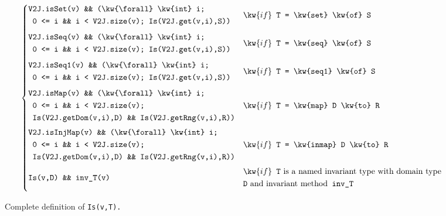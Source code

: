 \begin{figure*}[ht]
\begin{mdframed}
\begin{equation*}
\begin{cases}
  \!\begin{aligned}%
    & \texttt{V2J.isSet(v) \&\& (\kw{\textbackslash forall} \kw{int} i;}\\
    & \texttt{ 0 <= i \&\& i < V2J.size(v); Is(V2J.get(v,i),S))}
    \end{aligned}           & \kw{if} \texttt{ T = \kw{set} \kw{of} S}\\[\caseSpaceSeqSet]

  \!\begin{aligned}%
    & \texttt{V2J.isSeq(v) \&\& (\kw{\textbackslash forall} \kw{int} i;} \\
    & \texttt{ 0 <= i \&\& i < V2J.size(v); Is(V2J.get(v,i),S))}
    \end{aligned}           & \kw{if} \texttt{ T = \kw{seq} \kw{of} S}\\[\caseSpaceSeqSet]

  \!\begin{aligned}%
    & \texttt{V2J.isSeq1(v) \&\& (\kw{\textbackslash forall} \kw{int} i;} \\
    & \texttt{ 0 <= i \&\& i < V2J.size(v); Is(V2J.get(v,i),S))} \\
    \end{aligned}           & \kw{if} \texttt{ T = \kw{seq1} \kw{of} S}\\[\caseSpaceSeqSet]

  \!\begin{aligned}%
    & \texttt{V2J.isMap(v) \&\& (\kw{\textbackslash forall} \kw{int} i;} \\
    & \texttt{ 0 <= i \&\& i < V2J.size(v);} \\
    &\texttt{ Is(V2J.getDom(v,i),D) \&\& Is(V2J.getRng(v,i),R))}
    \end{aligned}           & \kw{if} \texttt{ T = \kw{map} D \kw{to} R}\\[\caseSpaceMap]

  \!\begin{aligned}%
    & \texttt{V2J.isInjMap(v) \&\& (\kw{\textbackslash forall} \kw{int} i;} \\
    & \texttt{ 0 <= i \&\& i < V2J.size(v);} \\
    &\texttt{ Is(V2J.getDom(v,i),D) \&\& Is(V2J.getRng(v,i),R))}
    \end{aligned}           & \kw{if} \texttt{ T = \kw{inmap} D \kw{to} R}\\[\caseSpaceMap]
    
  \texttt{Is(v,D) \&\& inv\_T(v)} &
  \!\begin{aligned}%
    & \kw{if} \texttt{ T} \text{ is a named invariant type with domain type }\\ 
    & \texttt{D} \text{ and invariant method} \texttt{ inv\_T}
    \end{aligned}\\[10.0\caseSpace]

\end{cases}
\end{equation*}
\end{mdframed}
\caption{Complete definition of \texttt{Is(v,T).}}
\label{fig:f-complete}
\end{figure*}

